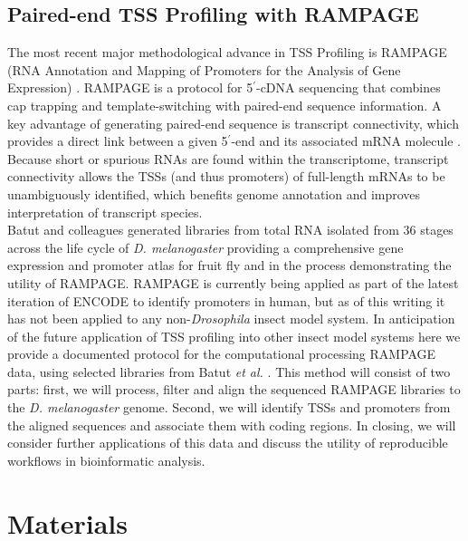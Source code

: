 \documentclass[runningheads,a4paper]{llncs}
\begin{document}
\begin{linenumbers}
\subsection{Paired-end TSS Profiling with RAMPAGE}
The most recent major methodological advance in TSS Profiling is RAMPAGE (RNA Annotation and Mapping of Promoters for the Analysis of Gene Expression) \cite{Batut:2012kc,Batut:2013fu}. 
RAMPAGE is a protocol for 5$^\prime$-cDNA sequencing that combines cap trapping and template-switching with paired-end sequence information. 
A key advantage of generating paired-end sequence is transcript connectivity, which provides a direct link between a given 5$^\prime$-end and its associated mRNA molecule \cite{Batut:2012kc}.
Because short or spurious RNAs are found within the transcriptome, transcript connectivity allows the TSSs (and thus promoters) of full-length mRNAs to be unambiguously identified, which benefits genome annotation and improves interpretation of transcript species.
\\
Batut and colleagues \cite{Batut:2012kc} generated libraries from total RNA isolated from 36 stages across the life cycle of \textit{D. melanogaster} providing a comprehensive gene expression and promoter atlas for fruit fly and in the process demonstrating the utility of RAMPAGE.
RAMPAGE is currently being applied as part of the latest iteration of ENCODE to identify promoters in human, but as of this writing it has not been applied to any non-\textit{Drosophila} insect model system. 
In anticipation of the future application of TSS profiling into other insect model systems here we provide a documented protocol for the computational processing RAMPAGE data, using selected libraries from Batut \textit{et al.} \cite{Batut:2012kc}. 
This method will consist of two parts: first, we will process, filter and align the sequenced RAMPAGE libraries to the \textit{D. melanogaster} genome. 
Second, we will identify TSSs and promoters from the aligned sequences and associate them with coding regions.
In closing, we will consider further applications of this data and discuss the utility of reproducible workflows in bioinformatic analysis.


\section{Materials}


\end{linenumbers}
\end{document}

